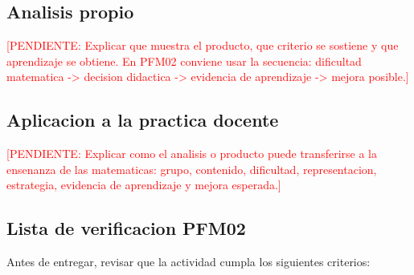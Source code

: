 \documentclass[
	spanish,
	letterpaper, oneside
]{article}
\newcommand{\pendiente}[1]{\textcolor{red}{[PENDIENTE: #1]}}
\begin{document}
%

\subsection{Analisis propio}

\pendiente{Explicar que muestra el producto, que criterio se sostiene y que aprendizaje se obtiene. En PFM02 conviene usar la secuencia: dificultad matematica -> decision didactica -> evidencia de aprendizaje -> mejora posible.}

\subsection{Aplicacion a la practica docente}

\pendiente{Explicar como el analisis o producto puede transferirse a la ensenanza de las matematicas: grupo, contenido, dificultad, representacion, estrategia, evidencia de aprendizaje y mejora esperada.}

\subsection{Lista de verificacion PFM02}

Antes de entregar, revisar que la actividad cumpla los siguientes criterios:
\end{document}
